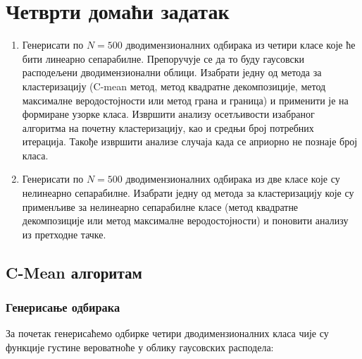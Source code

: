 \section{Четврти домаћи задатак}
\begin{enumerate}[1.]
\item Генерисати по $N=500$ дводимензионалних одбирака из четири класе које ће бити линеарно сепарабилне. Препоручује се да то буду гаусовски расподељени дводимензионални облици. Изабрати једну од метода за кластеризацију (C-mean метод, метод квадратне декомпозиције, метод максималне веродостојности или метод грана и граница) и применити је на формиране узорке класа. Извршити анализу осетљивости изабраног алгоритма на почетну кластеризацију, као и средњи број потребних итерација. Такође извршити анализе случаја када се априорно не познаје број класа.
\item Генерисати по $N=500$ дводимензионалних одбирака из две класе које су нелинеарно сепарабилне. Изабрати једну од метода за кластеризацију које су применљиве за нелинеарно сепарабилне класе (метод квадратне декомпозиције или метод максималне веродостојности) и поновити анализу из претходне тачке.
\end{enumerate}
\subsection{C-Mean алгоритам}
\subsubsection{Генерисање одбирака}
За почетак генерисаћемо одбирке четири дводимензионалних класа чије су функције густине вероватноће у облику  гаусовских расподела:


